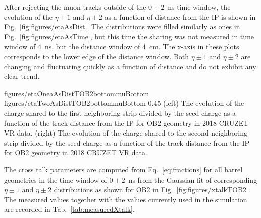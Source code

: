 After rejecting the muon tracks outside of the $0 \pm 2$~ns time window, the evolution of the $\eta \pm 1$ and $\eta \pm 2$ as a function of distance from the IP is shown in Fig.~\ref{fig:figures/etaAsDist}. The distributions were filled similarly as ones in Fig.~\ref{fig:figures/etaAsTime}, but this time the sharing was not measured in time window of 4~ns, but the distance window of 4~cm. The x-axis in these plots corresponds to the lower edge of the distance window. Both $\eta \pm 1$ and $\eta \pm 2$ are changing and fluctuating quickly as a function of distance and do not exhibit any clear trend. 

                 {figures/etaOneaAsDistTOB2bottommuBottom}
                 {figures/etaTwoAsDistTOB2bottommuBottom} %
                 {0.45}       %
                 {(left) The evolution of the charge shared to the first neighboring strip divided by the seed charge as a function of the track distance from the IP for OB2 geometry in 2018 CRUZET VR data.  (right) The evolution of the charge shared to the second neighboring strip divided by the seed charge as a function of the track distance from the IP for OB2 geometry in 2018 CRUZET VR data. }

The cross talk parameters are computed from Eq.~\ref{eq:fractions} for all barrel geometries in the time window of $0 \pm 2$~ns from the Gaussian fit of corresponding  $\eta \pm 1$ and $\eta \pm 2$ distributions as shown for OB2 in Fig.~\ref{fig:figures/xtalkTOB2}. The measured values together with the values currently used in the simulation are recorded in Tab.~\ref{tab:measuredXtalk}.


